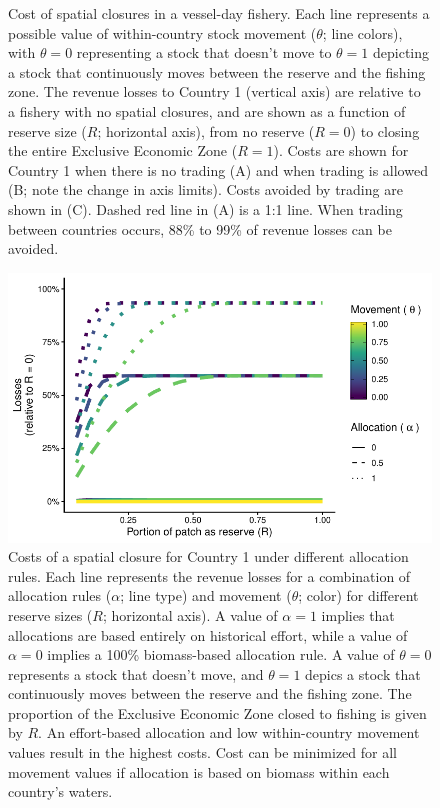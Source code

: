 \documentclass[12pt]{article}
\begin{document}
\begin{figure}[htbp]
\caption{\label{fig:PNA_model}Cost of spatial closures in a vessel-day fishery. Each line represents a possible value of within-country stock movement ($\theta$; line colors), with $\theta = 0$ representing a stock that doesn't move to $\theta = 1$ depicting a stock that continuously moves between the reserve and the fishing zone. The revenue losses to Country 1 (vertical axis) are relative to a fishery with no spatial closures, and are shown as a function of reserve size ($R$; horizontal axis), from no reserve ($R = 0$) to closing the entire Exclusive Economic Zone ($R = 1$). Costs are shown for Country 1 when there is no trading (A) and when trading is allowed (B; note the change in axis limits). Costs avoided by trading are shown in (C). Dashed red line in (A) is a 1:1 line. When trading between countries occurs, 88\% to 99\% of revenue losses can be avoided.}
\end{figure}

\begin{figure}[htbp]
\centering
\includegraphics{img/allocation_cost_plot.pdf}
\caption{\label{fig:allocation_cost_plot}Costs of a spatial closure for Country 1 under different allocation rules. Each line represents the revenue losses for a combination of allocation rules ($\alpha$; line type) and movement ($\theta$; color) for different reserve sizes ($R$; horizontal axis). A value of $\alpha = 1$ implies that allocations are based entirely on historical effort, while a value of $\alpha = 0$ implies a 100\% biomass-based allocation rule. A value of $\theta = 0$ represents a stock that doesn't move, and $\theta = 1$ depics a stock that continuously moves between the reserve and the fishing zone. The proportion of the Exclusive Economic Zone closed to fishing is given by $R$. An effort-based allocation and low within-country movement values result in the highest costs. Cost can be minimized for all movement values if allocation is based on biomass within each country's waters.}
\end{figure}
\end{document}
